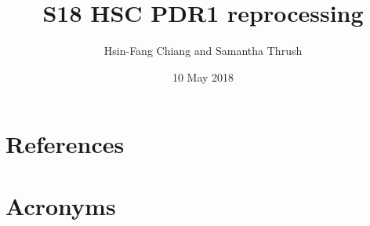 \documentclass[DM,authoryear,toc]{lsstdoc}
\title{S18 HSC PDR1 reprocessing}
\author{%
Hsin-Fang Chiang and Samantha Thrush
}
\date{10 May 2018}
\begin{document}
\maketitle



\appendix
\section{References} \label{sec:bib}
\renewcommand{\refname}{} %


\section{Acronyms} \label{sec:acronyms}

\end{document}

